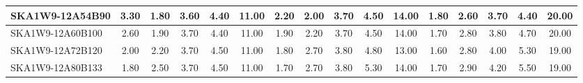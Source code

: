 \begin{table}[H]
{{\begin{tabular}{|lccccc||ccccc||ccccc|}
SKA1W9-12A54B90 & 3.30 \cellcolor{blue!60.00} & 1.80 \cellcolor{red!18.00} & 3.60 \cellcolor{green!18.00} & 4.40 \cellcolor{orange!18.00} & 11.00 \cellcolor{purple!60.00} & 2.20 \cellcolor{blue!44.25} & 2.00 \cellcolor{red!18.00} & 3.70 \cellcolor{green!18.00} & 4.50 \cellcolor{orange!18.00} & 14.00 \cellcolor{purple!60.00} & 1.80 \cellcolor{blue!26.40} & 2.60 \cellcolor{red!18.00} & 3.70 \cellcolor{green!18.00} & 4.40 \cellcolor{orange!18.00} & 20.00 \cellcolor{purple!60.00}\\ \hline 
SKA1W9-12A60B100 & 2.60 \cellcolor{blue!40.40} & 1.90 \cellcolor{red!21.50} & 3.70 \cellcolor{green!32.00} & 4.40 \cellcolor{orange!18.00} & 11.00 \cellcolor{purple!60.00} & 1.90 \cellcolor{blue!28.50} & 2.20 \cellcolor{red!26.40} & 3.70 \cellcolor{green!18.00} & 4.50 \cellcolor{orange!18.00} & 14.00 \cellcolor{purple!60.00} & 1.70 \cellcolor{blue!22.20} & 2.80 \cellcolor{red!46.00} & 3.80 \cellcolor{green!26.40} & 4.70 \cellcolor{orange!29.45} & 20.00 \cellcolor{purple!60.00}\\ \hline 
SKA1W9-12A72B120 & 2.00 \cellcolor{blue!23.60} & 2.20 \cellcolor{red!32.00} & 3.70 \cellcolor{green!32.00} & 4.50 \cellcolor{orange!28.50} & 11.00 \cellcolor{purple!60.00} & 1.80 \cellcolor{blue!23.25} & 2.70 \cellcolor{red!47.40} & 3.80 \cellcolor{green!28.50} & 4.80 \cellcolor{orange!33.75} & 13.00 \cellcolor{purple!18.00} & 1.60 \cellcolor{blue!18.00} & 2.80 \cellcolor{red!46.00} & 4.00 \cellcolor{green!43.20} & 5.30 \cellcolor{orange!52.36} & 19.00 \cellcolor{purple!39.00}\\ \hline 
SKA1W9-12A80B133 & 1.80 \cellcolor{blue!18.00} & 2.50 \cellcolor{red!42.50} & 3.70 \cellcolor{green!32.00} & 4.50 \cellcolor{orange!28.50} & 11.00 \cellcolor{purple!60.00} & 1.70 \cellcolor{blue!18.00} & 2.70 \cellcolor{red!47.40} & 3.80 \cellcolor{green!28.50} & 5.30 \cellcolor{orange!60.00} & 14.00 \cellcolor{purple!60.00} & 1.70 \cellcolor{blue!22.20} & 2.90 \cellcolor{red!60.00} & 4.20 \cellcolor{green!60.00} & 5.50 \cellcolor{orange!60.00} & 19.00 \cellcolor{purple!39.00}\\ \hline 
\end{tabular}}
\vspace{-0.300000cm}
\hspace{1cm} 
}
\end{table}
